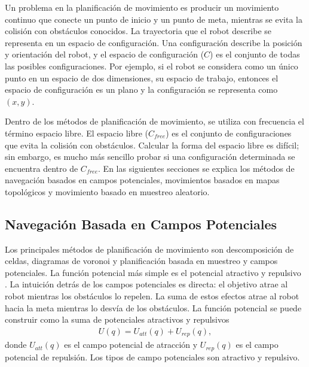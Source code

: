 Un problema en la planificación de movimiento es producir un movimiento 
continuo que conecte un punto de inicio y un punto de meta, mientras se evita 
la colisión con obstáculos conocidos. La trayectoria que el robot describe 
se representa en un espacio de configuración. Una configuración describe 
la posición y orientación del robot, y el espacio de configuración ($C$) es el conjunto 
de todas las posibles configuraciones. Por ejemplo, si el robot se considera como 
un único punto en un espacio de dos dimensiones, su espacio de trabajo, entonces 
el espacio de configuración es un plano y la configuración se representa 
como $(x,y)$.

Dentro de los métodos de planificación de movimiento, se utiliza con 
frecuencia el término espacio libre. El espacio libre ($C_{free}$) es el 
conjunto de configuraciones que evita la colisión con obstáculos. Calcular 
la forma del espacio libre es difícil; sin embargo, es mucho más sencillo 
probar si una configuración determinada se encuentra dentro de $C_{free}$. En 
las siguientes secciones se explica los métodos de navegación basados 
en campos potenciales, movimientos basados en mapas topológicos y 
movimiento basado en muestreo aleatorio.

\subsection{Navegación Basada en Campos Potenciales}
\label{sec:Campos Potenciales}
Los principales métodos de planificación de movimiento son descomposición de 
celdas, diagramas de voronoi y planificación basada en muestreo y campos 
potenciales. La función potencial más simple es el potencial atractivo y repulsivo 
\cite{khatib1985real}. La intuición detrás de los campos potenciales es 
directa: el objetivo atrae al robot mientras los obstáculos lo repelen. La suma 
de estos efectos atrae al robot hacia la meta mientras lo desvía de los 
obstáculos. La función potencial se puede construir como la suma de potenciales 
atractivos y repulsivos
\begin{align}
\label{eqn:potetialField}
U(q) = U_{att}(q) + U_{rep}(q),
\end{align}
donde $U_{att}(q)$ es el campo potencial de atracción y $U_{rep}(q)$ es el campo
potencial de repulsión. Los tipos de campo potenciales son atractivo y repulsivo.

